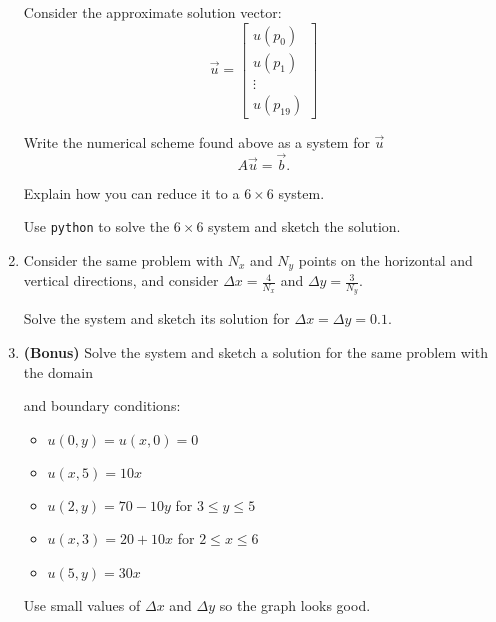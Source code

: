 \documentclass[letter]{article}
\newcommand{\mat}[1]{\begin{bmatrix}#1\end{bmatrix}}
\begin{document}
\begin{enumerate}[resume, label=\textbf{\arabic*.}]
\begin{center}
\begin{tikzpicture}
	\end{tikzpicture}	
	\end{center}

	Consider the approximate solution vector:
	\[ \vec{u} = 
		\mat{u(p_0) \\ u(p_1) \\ \vdots \\ u(p_{19}) }
	\]

	Write the numerical scheme found above as a system for $\vec{u}$
	\[
	A \vec{u} = \vec{b}.
	\]
	
	Explain how you can reduce it to a $6 \times 6$ system.
	
	Use \verb|python| to solve the $6\times 6$ system and sketch the solution.
	
	\item Consider the same problem with $N_x$ and $N_y$ points on the horizontal and vertical directions, and consider $\Delta x = \frac{4}{N_x}$ and $\Delta y = \frac{3}{N_y}$.
	
		Solve the system and sketch its solution for $\Delta x = \Delta y = 0.1$.
		
	\item \textbf{(Bonus)} Solve the system and sketch a solution for the same problem with the domain
		\begin{center}
		\end{center}
		and boundary conditions:
		\begin{itemize}
			\item $u(0,y) = u(x,0) = 0$
			\item $u(x,5) = 10x$
			\item $u(2,y) = 70-10y$ for $3 \leq y \leq 5$
			\item $u(x,3) = 20+10x$ for $2 \leq x \leq 6$
			\item $u(5,y) = 30x$
		\end{itemize}
	
		Use small values of $\Delta x$ and $\Delta y$ so the graph looks good.
	
\end{enumerate}




	
\end{document}
